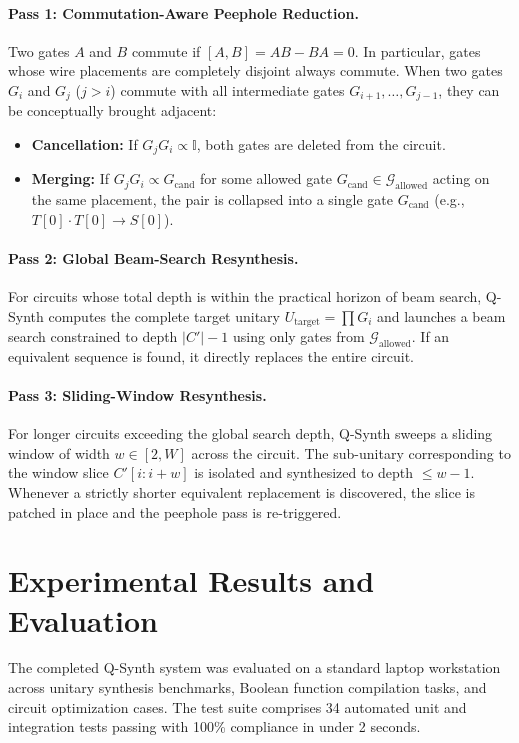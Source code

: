 \documentclass[11pt]{article}
\begin{document}
\paragraph{Pass 1: Commutation-Aware Peephole Reduction.}
Two gates $A$ and $B$ commute if $[A, B] = A B - B A = 0$. In particular, gates whose wire placements are completely disjoint always commute. When two gates $G_i$ and $G_j$ ($j > i$) commute with all intermediate gates $G_{i+1}, \dots, G_{j-1}$, they can be conceptually brought adjacent:
\begin{itemize}[leftmargin=*]
    \item \textbf{Cancellation:} If $G_j G_i \propto \mathbb{I}$, both gates are deleted from the circuit.
    \item \textbf{Merging:} If $G_j G_i \propto G_{\text{cand}}$ for some allowed gate $G_{\text{cand}} \in \mathcal{G}_{\text{allowed}}$ acting on the same placement, the pair is collapsed into a single gate $G_{\text{cand}}$ (e.g., $T[0] \cdot T[0] \to S[0]$).
\end{itemize}

\paragraph{Pass 2: Global Beam-Search Resynthesis.}
For circuits whose total depth is within the practical horizon of beam search, Q-Synth computes the complete target unitary $U_{\text{target}} = \prod G_i$ and launches a beam search constrained to depth $|C'|-1$ using only gates from $\mathcal{G}_{\text{allowed}}$. If an equivalent sequence is found, it directly replaces the entire circuit.

\paragraph{Pass 3: Sliding-Window Resynthesis.}
For longer circuits exceeding the global search depth, Q-Synth sweeps a sliding window of width $w \in [2, W]$ across the circuit. The sub-unitary corresponding to the window slice $C'[i : i+w]$ is isolated and synthesized to depth $\le w-1$. Whenever a strictly shorter equivalent replacement is discovered, the slice is patched in place and the peephole pass is re-triggered.

\section{Experimental Results and Evaluation}
The completed Q-Synth system was evaluated on a standard laptop workstation across unitary synthesis benchmarks, Boolean function compilation tasks, and circuit optimization cases. The test suite comprises 34 automated unit and integration tests passing with 100\% compliance in under 2 seconds.
\end{document}
